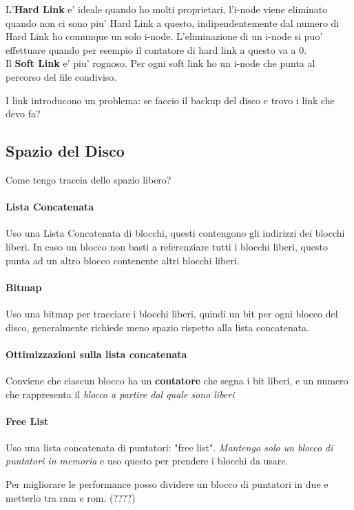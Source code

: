 L'\textbf{Hard Link} e' ideale quando ho molti proprietari, l'i-node viene eliminato quando non ci sono piu'
Hard Link a questo, indipendentemente dal numero di Hard Link ho comunque un solo i-node.
L'eliminazione di un i-node si puo' effettuare quando per esempio il contatore di hard link a questo va a 0. \\

Il \textbf{Soft Link} e' piu' rognoso. Per ogni soft link ho un i-node che punta al percorso del file condiviso.

I link introducono un problema: se faccio il backup del disco e trovo i link che devo fa?

\subsection{Spazio del Disco}
Come tengo traccia dello spazio libero?
\paragraph{Lista Concatenata}
Uso una Lista Concatenata di blocchi, questi contengono gli indirizzi dei blocchi liberi.
In caso un blocco non basti a referenziare tutti i blocchi liberi, questo punta ad un altro blocco contenente
altri blocchi liberi.

\paragraph{Bitmap}
Uso una bitmap per tracciare i blocchi liberi, quindi un bit per ogni blocco del disco, generalmente
richiede meno spazio rispetto alla lista concatenata.

\paragraph{Ottimizzazioni sulla lista concatenata}
Conviene che ciascun blocco ha un \textbf{contatore} che segna i bit liberi, e un numero che rappresenta
il \textit{blocco a partire dal quale sono liberi}

\paragraph{Free List}
Uso una lista concatenata di puntatori: "free list". \textit{Mantengo solo un blocco di puntatori in memoria} e uso questo per
prendere i blocchi da usare.

Per migliorare le performance posso dividere un blocco di puntatori in due e metterlo tra ram e rom. (????)

